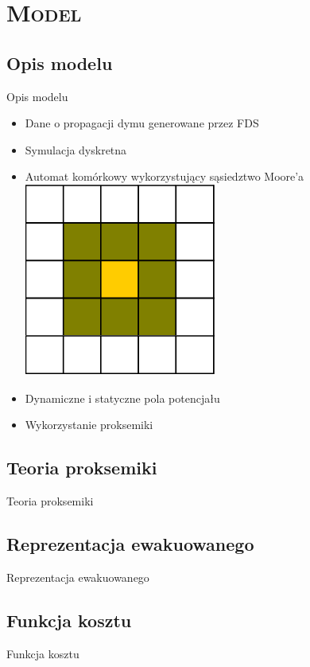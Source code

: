 \section{\scshape Model}

\subsection{Opis modelu}
\begin{frame}{Opis modelu}
	\begin{itemize}
	\item Dane o propagacji dymu generowane przez FDS
	\item Symulacja dyskretna
	\item Automat komórkowy wykorzystujący sąsiedztwo Moore'a
	\includegraphics[width=	 	 			  textwidth,height=0.8\textheight,keepaspectratio]{moore}
	\item Dynamiczne i statyczne pola potencjału
	\item Wykorzystanie proksemiki
	\end{itemize}
\end{frame}

\subsection{Teoria proksemiki}
\begin{frame}{Teoria proksemiki}
\end{frame}

\subsection{Reprezentacja ewakuowanego}
\begin{frame}{Reprezentacja ewakuowanego}
\end{frame}

\subsection{Funkcja kosztu}
\begin{frame}{Funkcja kosztu}
\end{frame}